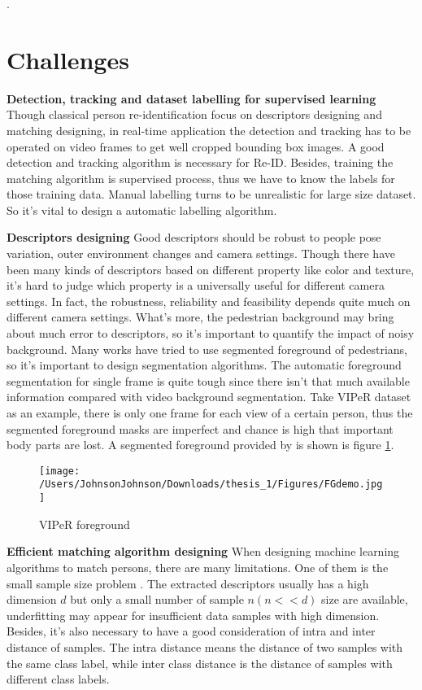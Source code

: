 .

\section{Challenges}

\textbf{Detection, tracking and dataset labelling for supervised learning} Though classical person re-identification focus on descriptors designing and matching designing, in real-time application the detection and tracking has to be operated on video frames to get well cropped bounding box images. A good detection and tracking algorithm is necessary for Re-ID. Besides, training the matching algorithm is supervised process, thus we have to know the labels for those training data. Manual labelling turns to be unrealistic for large size dataset. So it's vital to design a automatic labelling algorithm.

\textbf{Descriptors designing} Good descriptors should be robust to people pose variation, outer environment changes and camera settings. Though there have been many kinds of descriptors based on different property like color and texture, it's hard to judge which property is a universally useful for different camera settings. In fact, the robustness, reliability and feasibility depends quite much on different camera settings. What's more, the pedestrian background may bring about much error to descriptors, so it's important to quantify the impact of noisy background. Many works have tried to use segmented foreground of pedestrians, so it's important to design segmentation algorithms. The automatic foreground segmentation for single frame is quite tough since there isn't that much available information compared with video background segmentation. Take VIPeR dataset as an example, there is only one frame for each view of a certain person, thus the segmented foreground masks are imperfect and chance is high that important body parts are lost. A segmented foreground provided by \cite{SDALF} is shown is figure \ref{VIPeRFG}.
\begin{figure}[H]
\centering
\texttt{[image: /Users/JohnsonJohnson/Downloads/thesis\_1/Figures/FGdemo.jpg]}
\vspace{-3em}
\caption{VIPeR foreground}
\label{VIPeRFG}
\end{figure}

\textbf{Efficient matching algorithm designing} 	
When designing machine learning algorithms to match persons, there are many limitations. One of them is the small sample size problem \cite{NFST}. The extracted descriptors usually has a high dimension $d$ but only a small number of sample $n(n<<d)$ size are available, underfitting may appear for insufficient data samples with high dimension. Besides, it's also necessary to have a good consideration of intra and inter distance of samples.
The intra distance means the distance of two samples with the same class label, while inter class distance is the distance of samples with different class labels. 

